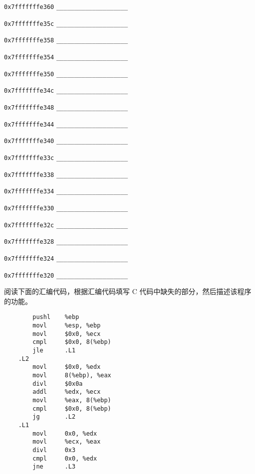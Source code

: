 \begin{problems}
\begin{compactdesc}
            \item[\texttt{0x7fffffffe360}] \verb|____________________|
            \item[\texttt{0x7fffffffe35c}] \verb|____________________|
            \item[\texttt{0x7fffffffe358}] \verb|____________________|
            \item[\texttt{0x7fffffffe354}] \verb|____________________|
            \item[\texttt{0x7fffffffe350}] \verb|____________________|
            \item[\texttt{0x7fffffffe34c}] \verb|____________________|
            \item[\texttt{0x7fffffffe348}] \verb|____________________|
            \item[\texttt{0x7fffffffe344}] \verb|____________________|
            \item[\texttt{0x7fffffffe340}] \verb|____________________|
            \item[\texttt{0x7fffffffe33c}] \verb|____________________|
            \item[\texttt{0x7fffffffe338}] \verb|____________________|
            \item[\texttt{0x7fffffffe334}] \verb|____________________|
            \item[\texttt{0x7fffffffe330}] \verb|____________________|
            \item[\texttt{0x7fffffffe32c}] \verb|____________________|
            \item[\texttt{0x7fffffffe328}] \verb|____________________|
            \item[\texttt{0x7fffffffe324}] \verb|____________________|
            \item[\texttt{0x7fffffffe320}] \verb|____________________|
        \end{compactdesc}
         阅读下面的汇编代码，根据汇编代码填写 C 代码中缺失的部分，然后描述该程序的功能。
        \begin{verbatim}
        pushl    %ebp
        movl     %esp, %ebp
        movl     $0x0, %ecx
        cmpl     $0x0, 8(%ebp)
        jle      .L1
    .L2
        movl     $0x0, %edx
        movl     8(%ebp), %eax
        divl     $0x0a
        addl     %edx, %ecx
        movl     %eax, 8(%ebp)
        cmpl     $0x0, 8(%ebp)
        jg       .L2
    .L1
        movl     0x0, %edx
        movl     %ecx, %eax
        divl     0x3
        cmpl     0x0, %edx
        jne      .L3

\end{verbatim}
\end{problems}
